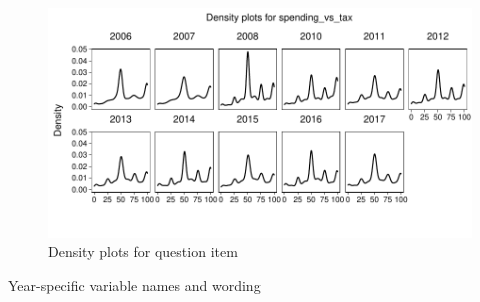 \documentclass[
  12pt]{article}
\begin{document}
\begin{figure}

{\centering \includegraphics{guide_cumulative_ces_policy_preferences_files/figure-latex/unnamed-chunk-5-1} 

}

\caption{Density plots for question item}\label{fig:unnamed-chunk-5-1}
\end{figure}

Year-specific variable names and
wording\begingroup\fontsize{11}{13}\selectfont
\end{document}
